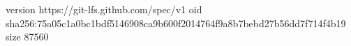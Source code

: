 version https://git-lfs.github.com/spec/v1
oid sha256:75a05c1a0bc1bdf5146908ca9b600f2014764f9a8b7bebd27b56dd7f714f4b19
size 87560
